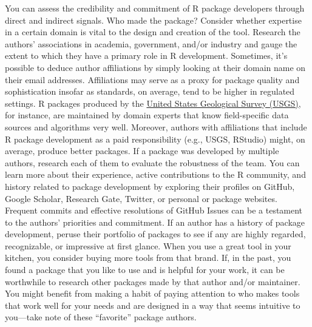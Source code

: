 \documentclass[10pt,letterpaper]{article}
\begin{document}
You can assess the credibility and commitment of R package developers
through direct and indirect signals. Who made the package? Consider
whether expertise in a certain domain is vital to the design and
creation of the tool. Research the authors' associations in academia,
government, and/or industry and gauge the extent to which they have a
primary role in R development. Sometimes, it's possible to deduce author
affiliations by simply looking at their domain name on their email
addresses. Affiliations may serve as a proxy for package quality and
sophistication insofar as standards, on average, tend to be higher in
regulated settings. R packages produced by the
\href{https://owi.usgs.gov/R/}{United States Geological Survey (USGS)},
for instance, are maintained by domain experts that know field-specific
data sources and algorithms very well. Moreover, authors with
affiliations that include R package development as a paid responsibility
(e.g., USGS, RStudio) might, on average, produce better packages. If a
package was developed by multiple authors, research each of them to
evaluate the robustness of the team. You can learn more about their
experience, active contributions to the R community, and history related
to package development by exploring their profiles on GitHub, Google
Scholar, Research Gate, Twitter, or personal or package websites.
Frequent commits and effective resolutions of GitHub Issues can be a
testament to the authors' priorities and commitment. If an author has a
history of package development, peruse their portfolio of packages to
see if any are highly regarded, recognizable, or impressive at first
glance. When you use a great tool in your kitchen, you consider buying
more tools from that brand. If, in the past, you found a package that
you like to use and is helpful for your work, it can be worthwhile to
research other packages made by that author and/or maintainer. You might
benefit from making a habit of paying attention to who makes tools that
work well for your needs and are designed in a way that seems intuitive
to you---take note of these ``favorite'' package authors.
\end{document}
